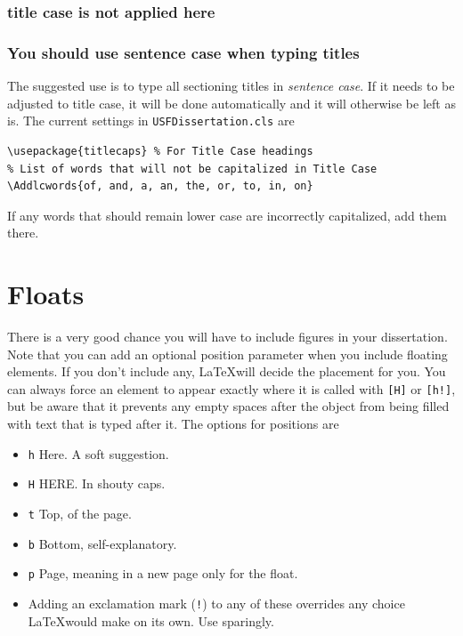 \subsubsection{title case is not applied here}
\subsubsection{You should use sentence case when typing titles}
The suggested use is to type all sectioning titles in {\em sentence case}. If it needs to be adjusted to title case, it will be done automatically and it will otherwise be left as is. The current settings in \texttt{USFDissertation.cls} are
\begin{lstlisting}
\usepackage{titlecaps} % For Title Case headings
% List of words that will not be capitalized in Title Case
\Addlcwords{of, and, a, an, the, or, to, in, on}
\end{lstlisting}
If any words that should remain lower case are incorrectly capitalized, add them there.

\section{Floats}
There is a very good chance you will have to include figures in your dissertation. Note that you can add an optional position parameter when you include floating elements. If you don't include any, \LaTeX will decide the placement for you. You can always force an element to appear exactly where it is called with \texttt{[H]} or \texttt{[h!]}, but be aware that it prevents any empty spaces after the object from being filled with text that is typed after it. The options for positions are 
\begin{itemize}
\item \texttt{h} Here. A soft suggestion.
\item \texttt{H} HERE. In shouty caps.
\item \texttt{t} Top, of the page.
\item \texttt{b} Bottom, self-explanatory.
\item \texttt{p} Page, meaning in a new page only for the float.
\item Adding an exclamation mark (\texttt{!}) to any of these overrides any choice \LaTeX would make on its own. Use sparingly.
\end{itemize}

